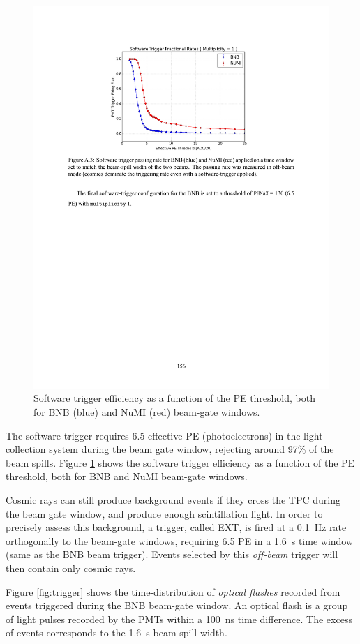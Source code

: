 \begin{figure}[htbp]
    \centering
    \includegraphics[width=0.85\linewidth]{figures/pmttrigger.pdf}
    \caption{Software trigger efficiency as a function of the PE threshold, both for BNB (blue) and NuMI (red) beam-gate windows.}
    \label{fig:pmttrigger}
\end{figure}

The software trigger requires 6.5 effective PE (photoelectrons) in the light collection system during the beam gate window, rejecting around 97\% of the beam spills. Figure \ref{fig:pmttrigger} shows the software trigger efficiency as a function of the PE threshold, both for BNB and NuMI beam-gate windows.

Cosmic rays can still produce background events if they cross the TPC during the beam gate window, and produce enough scintillation light. In order to precisely assess this background, a trigger, called EXT, is fired at a 0.1~Hz rate orthogonally to the beam-gate windows, requiring 6.5 PE in a 1.6~\si{\micro}s time window (same as the BNB beam trigger). Events selected by this \emph{off-beam} trigger will then contain only cosmic rays.

Figure \ref{fig:trigger} shows the time-distribution of \emph{optical flashes} recorded from events triggered during the BNB beam-gate window. An optical flash is a group of light pulses recorded by the PMTs within a 100~ns time difference. The excess of events corresponds to the 1.6~\si{\micro}s beam spill width. 


